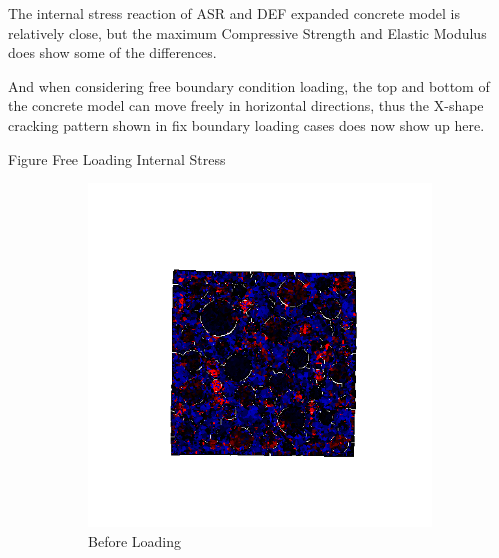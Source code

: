 The internal stress reaction of ASR and DEF expanded concrete model is relatively close, but the maximum Compressive Strength and Elastic Modulus does show some of the differences.

And when considering free boundary condition loading, the top and bottom of the concrete model can move freely in horizontal directions, thus the X-shape cracking pattern shown in fix boundary loading cases does now show up here.


Figure Free Loading Internal Stress


\begin{figure}[ht]
\centering

    \begin{subfigure}{.33\textwidth}
      \centering
      \includegraphics[width=1.0\linewidth]{Files/A30P75_3_IS/DEP50-STEP(020).png}
      \caption{Before Loading}
    \end{subfigure}%
    \begin{subfigure}{.33\textwidth}
      \centering

\end{subfigure}
\end{figure}
